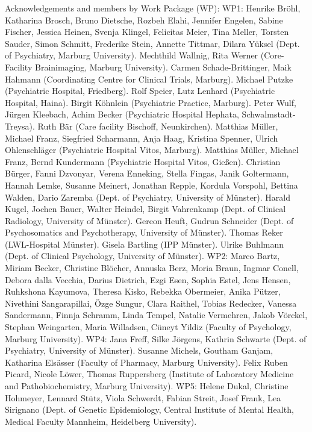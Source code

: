 \documentclass{article}
\begin{document}
    Acknowledgements and members by Work Package (WP):
    WP1: Henrike Bröhl, Katharina Brosch, Bruno Dietsche, Rozbeh Elahi, Jennifer Engelen, Sabine Fischer, Jessica Heinen, Svenja Klingel, Felicitas Meier, Tina Meller, Torsten Sauder, Simon Schmitt, Frederike Stein, Annette Tittmar, Dilara Yüksel (Dept. of Psychiatry, Marburg University). Mechthild Wallnig, Rita Werner (Core-Facility Brainimaging, Marburg University). Carmen Schade-Brittinger, Maik Hahmann (Coordinating Centre for Clinical Trials, Marburg). Michael Putzke (Psychiatric Hospital, Friedberg). Rolf Speier, Lutz Lenhard (Psychiatric Hospital, Haina). Birgit Köhnlein (Psychiatric Practice, Marburg). Peter Wulf, Jürgen Kleebach, Achim Becker (Psychiatric Hospital Hephata, Schwalmstadt-Treysa). Ruth Bär (Care facility Bischoff, Neunkirchen). Matthias Müller, Michael Franz, Siegfried Scharmann, Anja Haag, Kristina Spenner, Ulrich Ohlenschläger (Psychiatric Hospital Vitos, Marburg). Matthias Müller, Michael Franz, Bernd Kundermann (Psychiatric Hospital Vitos, Gießen). Christian Bürger, Fanni Dzvonyar, Verena Enneking, Stella Fingas, Janik Goltermann, Hannah Lemke, Susanne Meinert, Jonathan Repple, Kordula Vorspohl, Bettina Walden, Dario Zaremba (Dept. of Psychiatry, University of Münster). Harald Kugel, Jochen Bauer, Walter Heindel, Birgit Vahrenkamp (Dept. of Clinical Radiology, University of Münster). Gereon Heuft, Gudrun Schneider (Dept. of Psychosomatics and Psychotherapy, University of Münster). Thomas Reker (LWL-Hospital Münster). Gisela Bartling (IPP Münster). Ulrike Buhlmann (Dept. of Clinical Psychology, University of Münster).
    WP2: Marco Bartz, Miriam Becker, Christine Blöcher, Annuska Berz, Moria Braun, Ingmar Conell, Debora dalla Vecchia, Darius Dietrich, Ezgi Esen, Sophia Estel, Jens Hensen, Ruhkshona Kayumova, Theresa Kisko, Rebekka Obermeier, Anika Pützer, Nivethini Sangarapillai, Özge Sungur, Clara Raithel, Tobias Redecker, Vanessa Sandermann, Finnja Schramm, Linda Tempel, Natalie Vermehren, Jakob Vörckel, Stephan Weingarten, Maria Willadsen, Cüneyt Yildiz (Faculty of Psychology, Marburg University).
    WP4: Jana Freff, Silke Jörgens, Kathrin Schwarte (Dept. of Psychiatry, University of Münster). Susanne Michels, Goutham Ganjam, Katharina Elsässer (Faculty of Pharmacy, Marburg University). Felix Ruben Picard, Nicole Löwer, Thomas Ruppersberg (Institute of Laboratory Medicine and Pathobiochemistry, Marburg University).
    WP5: Helene Dukal, Christine Hohmeyer, Lennard Stütz, Viola Schwerdt, Fabian Streit, Josef Frank, Lea Sirignano (Dept. of Genetic Epidemiology, Central Institute of Mental Health, Medical Faculty Mannheim, Heidelberg University).
\end{document}

